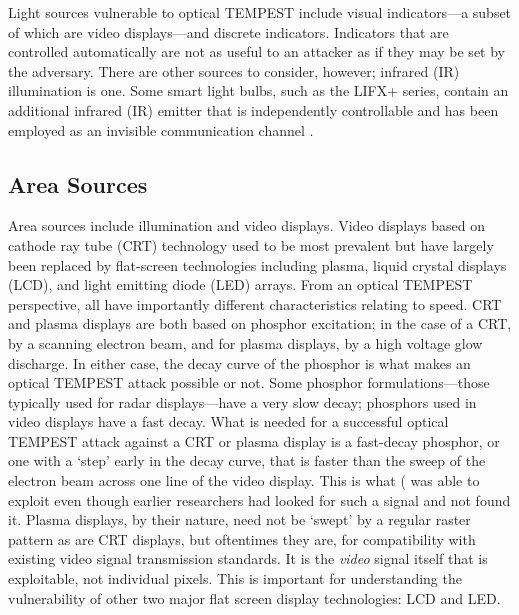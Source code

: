 \documentclass[a4paper,twoside,11pt]{book}
\begin{document}
Light sources vulnerable to optical TEMPEST include visual indicators---a
subset of which are video displays---and discrete indicators. Indicators that
are controlled automatically are not as useful to an attacker as if they may be
set by the adversary. There are other sources to consider, however; infrared
(IR) illumination is one. Some smart light bulbs, such as the LIFX+ series,
contain an additional infrared (IR) emitter that is independently controllable
and has been employed as an invisible communication channel \cite{Maiti2018b}.

\subsection{Area Sources}

Area sources include illumination and video displays. Video displays based on
cathode ray tube (CRT) technology used to be most prevalent but have largely
been replaced by flat-screen technologies including plasma, liquid crystal
displays (LCD), and light emitting diode (LED) arrays. From an optical TEMPEST
perspective, all have importantly different characteristics relating to speed.
CRT and plasma displays are both based on phosphor excitation; in the case of a
CRT, by a scanning electron beam, and for plasma displays, by a high voltage
glow discharge. In either case, the decay curve of the phosphor is what makes
an optical TEMPEST attack possible or not. Some phosphor formulations---those
typically used for radar displays---have a very slow decay; phosphors used in
video displays have a fast decay. What is needed for a successful optical
TEMPEST attack against a CRT or plasma display is a fast-decay phosphor, or one
with a `step' early in the decay curve, that is faster than the sweep of the
electron beam across one line of the video display. This is what
\citeauthor{Kuhn2002} (\citeyear{Kuhn2002} was able to exploit even though
earlier researchers had looked for such a signal and not found it. Plasma
displays, by their nature, need not be `swept' by a regular raster pattern as
are CRT displays, but oftentimes they are, for compatibility with existing
video signal transmission standards. It is the \emph{video} signal itself that
is exploitable, not individual pixels. This is important for understanding the
vulnerability of other two major flat screen display technologies: LCD and LED.
\end{document}
